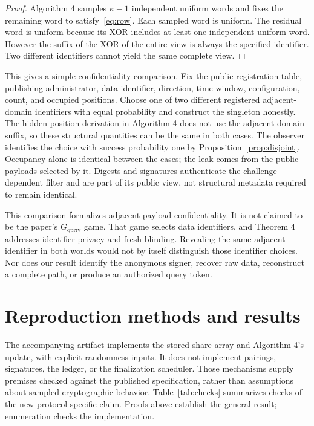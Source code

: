 \documentclass[11pt]{article}
\begin{document}
\begin{proof}
Algorithm 4 samples $\kappa-1$ independent uniform words and fixes the remaining
word to satisfy~\eqref{eq:row}. Each sampled word is uniform. The residual word
is uniform because its XOR includes at least one independent uniform word.
However the suffix of the XOR of the entire view is always the specified
identifier. Two different identifiers cannot yield the same complete view.
\end{proof}

This gives a simple confidentiality comparison. Fix the public registration
table, publishing administrator, data identifier, direction, time window,
configuration, count, and occupied positions. Choose one of two different
registered adjacent-domain identifiers with equal probability and construct
the singleton honestly. The hidden position derivation in Algorithm 4 does
not use the adjacent-domain suffix, so these structural quantities can be the
same in both cases. The observer identifies the choice with success
probability one by Proposition~\ref{prop:disjoint}. Occupancy alone is identical
between the cases; the leak comes from the public payloads selected by it.
Digests and signatures authenticate the challenge-dependent filter and are
part of its public view, not structural metadata required to remain identical.

This comparison formalizes adjacent-payload confidentiality. It is not claimed
to be the paper's $G_{\mathrm{qpriv}}$ game. That game selects data identifiers,
and Theorem 4 addresses identifier privacy and fresh blinding. Revealing the
same adjacent identifier in both worlds would not by itself distinguish those
identifier choices. Nor does our result identify the anonymous signer, recover
raw data, reconstruct a complete path, or produce an authorized query token.

\section{Reproduction methods and results}

The accompanying artifact implements the stored share array and Algorithm 4's
update, with explicit randomness inputs. It does not implement pairings,
signatures, the ledger, or the finalization scheduler. Those mechanisms supply
premises checked against the published specification, rather than assumptions
about sampled cryptographic behavior. Table~\ref{tab:checks} summarizes checks
of the new protocol-specific claim. Proofs above establish the general result;
enumeration checks the implementation.
\end{document}
